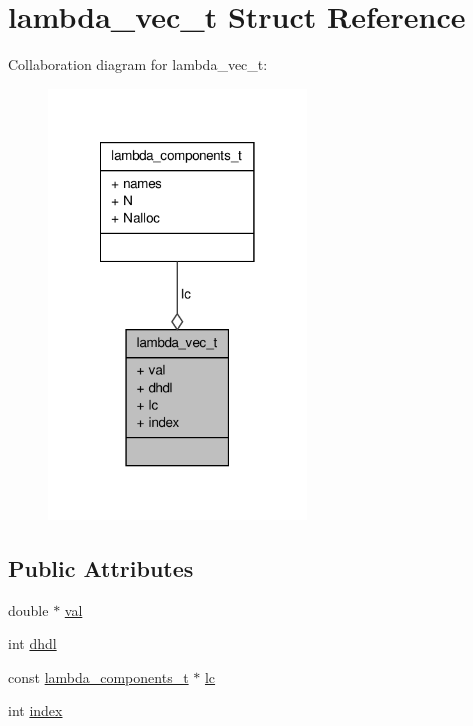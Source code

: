 \hypertarget{structlambda__vec__t}{\section{lambda\-\_\-vec\-\_\-t \-Struct \-Reference}
\label{structlambda__vec__t}
}


\-Collaboration diagram for lambda\-\_\-vec\-\_\-t\-:
\nopagebreak
\begin{figure}[H]
\begin{center}
\leavevmode
\includegraphics[width=194pt]{structlambda__vec__t__coll__graph}
\end{center}
\end{figure}
\subsection*{\-Public \-Attributes}
\begin{DoxyCompactItemize}
\item 
double $\ast$ \hyperlink{structlambda__vec__t_a614480105677697b5e6a2b95f0e221a3}{val}
\item 
int \hyperlink{structlambda__vec__t_a835a9658dd280075e0809d7caaeaca73}{dhdl}
\item 
const \hyperlink{structlambda__components__t}{lambda\-\_\-components\-\_\-t} $\ast$ \hyperlink{structlambda__vec__t_aed2eb8663ec3691d5394920e4a5add44}{lc}
\item 
int \hyperlink{structlambda__vec__t_a2a76f867aaac9458a164e97a151fed31}{index}
\end{DoxyCompactItemize}


